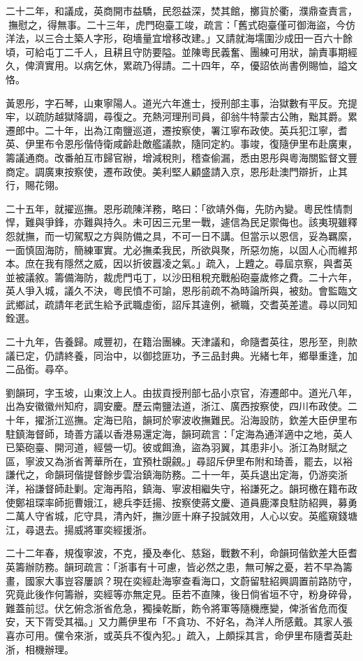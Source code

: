\begin{pinyinscope}
二十二年，和議成，英商開市益驕，民怨益深，焚其館，擲貨於衢，濮鼎查責言，撫慰之，得無事。二十三年，虎門砲臺工竣，疏言：「舊式砲臺僅可御海盜，今仿洋法，以三合土築人字形，砲墻量宜增移改建。」又請就海壖圍沙成田一百六十餘頃，可給屯丁二千人，且耕且守防要隘。並陳粵民義奮、團練可用狀，諭責事期經久，俾濟實用。以病乞休，累疏乃得請。二十四年，卒，優詔依尚書例賜恤，謚文恪。

黃恩彤，字石琴，山東寧陽人。道光六年進士，授刑部主事，治獄數有平反。充提牢，以疏防越獄降調，尋復之。充熱河理刑司員，卻翁牛特蒙古公賄，黜其爵。累遷郎中。二十年，出為江南鹽巡道，遷按察使，署江寧布政使。英兵犯江寧，耆英、伊里布令恩彤偕侍衛咸齡赴敵艦議款，隨同定約。事竣，復隨伊里布赴廣東，籌議通商。改番舶互市歸官辦，增減稅則，稽查偷漏，悉由恩彤與粵海關監督文豐商定。調廣東按察使，遷布政使。美利堅人顧盛請入京，恩彤赴澳門辯折，止其行，賜花翎。

二十五年，就擢巡撫。恩彤疏陳洋務，略曰：「欲靖外侮，先防內變。粵民性情剽悍，難與爭鋒，亦難與持久。未可因三元里一戰，遽信為民足禦侮也。該夷現雖釋怨就撫，而一切駕馭之方與防備之具，不可一日不講。但當示以恩信，妥為羈縻，一面慎固海防，簡練軍實。尤必撫柔我民，所欲與聚，所惡勿施，以固人心而維邦本。庶在我有隱然之威，因以折彼囂凌之氣。」疏入，上韙之。尋屆京察，與耆英並被議敘。籌備海防，裁虎門屯丁，以沙田租稅充戰船砲臺歲修之費。二十六年，英人爭入城，議久不決，粵民憤不可諭，恩彤前疏不為時論所與，被劾。會監臨文武鄉試，疏請年老武生給予武職虛銜，詔斥其違例，褫職，交耆英差遣。尋以同知銓選。

二十九年，告養歸。咸豐初，在籍治團練。天津議和，命隨耆英往，恩彤至，則款議已定，仍請終養，同治中，以御捻匪功，予三品封典。光緒七年，鄉舉重逢，加二品銜。尋卒。

劉韻珂，字玉坡，山東汶上人。由拔貢授刑部七品小京官，洊遷郎中。道光八年，出為安徽徽州知府，調安慶。歷云南鹽法道，浙江、廣西按察使，四川布政使。二十年，擢浙江巡撫。定海已陷，韻珂於寧波收撫難民。沿海設防，欽差大臣伊里布駐鎮海督師，琦善方議以香港易還定海，韻珂疏言：「定海為通洋適中之地，英人已築砲臺、開河道，經營一切。彼或餌漁，盜為羽翼，其患非小。浙江為財賦之區，寧波又為浙省菁華所在，宜預杜覬覦。」尋詔斥伊里布附和琦善，罷去，以裕謙代之，命韻珂偕提督餘步雲治鎮海防務。二十一年，英兵退出定海，仍游奕浙洋，裕謙督師赴剿。定海再陷，鎮海、寧波相繼失守，裕謙死之。韻珂檄在籍布政使鄭祖琛率師扼曹娥江，總兵李廷揚、按察使蔣文慶、道員鹿澤良駐防紹興，募勇二萬人守省城，庀守具，清內奸，撫沙匪十麻子投誠效用，人心以安。英艦窺錢塘江，尋退去。揚威將軍奕經援浙。

二十二年春，規復寧波，不克，擾及奉化、慈谿，戰數不利，命韻珂偕欽差大臣耆英籌辦防務。韻珂疏言：「浙事有十可慮，皆必然之患，無可解之憂，若不早為籌畫，國家大事豈容屢誤？現在奕經赴海寧查看海口，文蔚留駐紹興調置前路防守，究竟此後作何籌辦，奕經等亦無定見。臣若不直陳，後日倘省垣不守，粉身碎骨，難蓋前愆。伏乞俯念浙省危急，獨操乾斷，飭令將軍等隨機應變，俾浙省危而復安，天下胥受其福。」又力薦伊里布「不貪功、不好名，為洋人所感戴。其家人張喜亦可用。儻令來浙，或英兵不復內犯。」疏入，上頗採其言，命伊里布隨耆英赴浙，相機辦理。


\end{pinyinscope}
